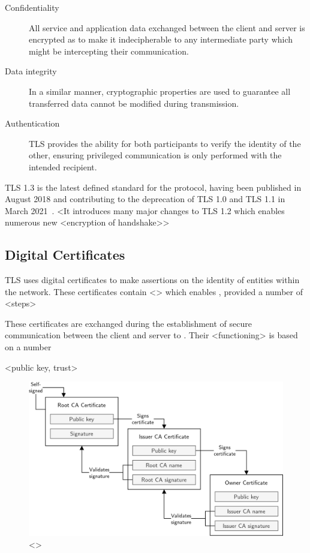 \begin{description}
	\item[Confidentiality] All service and application data exchanged between the client and server is encrypted as to make it indecipherable to any intermediate party which might be intercepting their communication.
	\item[Data integrity] In a similar manner, cryptographic properties are used to guarantee all transferred data cannot be modified during transmission.
	\item[Authentication] TLS provides the ability for both participants to verify the identity of the other, ensuring privileged communication is only performed with the intended recipient.
\end{description}

TLS 1.3 is the latest defined standard for the protocol, having been published in August 2018 and contributing to the deprecation of TLS 1.0 and TLS 1.1 in March 2021~\cite{rfc8446, rfc8996}. <It introduces many major changes to TLS 1.2 which enables numerous new <encryption of handshake>>

\subsection{Digital Certificates}

TLS uses digital certificates to make assertions on the identity of entities within the network. These certificates contain <> which enables , provided a number of <steps>

These certificates are exchanged during the establishment of secure communication between the client and server to . Their <functioning> is based on a number

<public key, trust>

\begin{figure}[ht]
\centerline{\includegraphics[width=160mm]{images/tls-chain.png}}
\caption[TLS certificate chain of trust]{<>}
\label{tls_chain_figure}
\end{figure}

